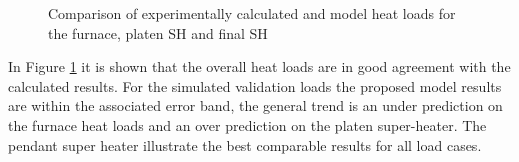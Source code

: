 \documentclass[review]{elsarticle}
\begin{document}
\begin{figure}[h!]
\caption{Comparison of experimentally calculated and model heat loads for the furnace, platen SH and final SH}
\label{fig_heat_valid}
\end{figure}
\clearpage
In Figure \ref{fig_heat_valid} it is shown that the overall heat loads are in good agreement with the calculated results. For the simulated validation loads the proposed model results are within the associated error band, the general trend is an under prediction on the furnace heat loads and an over prediction on the platen super-heater. The pendant super heater illustrate the best comparable results for all load cases.
\end{document}
